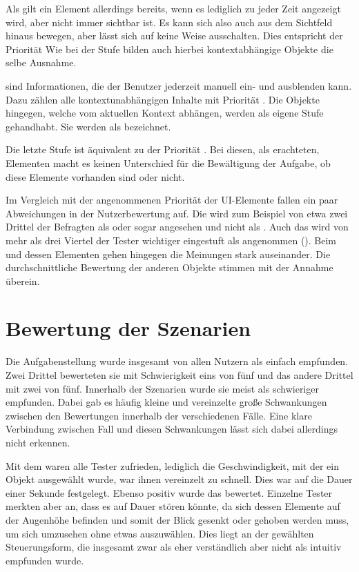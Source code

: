 		Als  gilt ein Element allerdings bereits, wenn es lediglich zu jeder Zeit angezeigt wird, aber nicht immer sichtbar ist. Es kann sich also auch aus dem Sichtfeld hinaus bewegen, aber lässt sich auf keine Weise ausschalten. Dies entspricht der Priorität  Wie bei der Stufe  bilden auch hierbei kontextabhängige Objekte die selbe Ausnahme.
		
		 sind Informationen, die der Benutzer jederzeit manuell ein- und ausblenden kann. Dazu zählen alle kontextunabhängigen Inhalte mit Priorität .
		Die Objekte hingegen, welche vom aktuellen Kontext abhängen, werden als eigene Stufe gehandhabt. Sie werden als  bezeichnet.
		
		Die letzte Stufe ist äquivalent zu der Priorität . Bei diesen, als  erachteten, Elementen macht es keinen Unterschied für die Bewältigung der Aufgabe, ob diese Elemente vorhanden sind oder nicht.
		
		Im Vergleich mit der angenommenen Priorität der UI-Elemente fallen ein paar Abweichungen in der Nutzerbewertung auf. Die  wird zum Beispiel von etwa zwei Drittel der Befragten als  oder sogar  angesehen und nicht als . Auch das  wird von mehr als drei Viertel der Tester wichtiger eingestuft als angenommen (). Beim  und dessen Elementen gehen hingegen die Meinungen stark auseinander. Die durchschnittliche Bewertung der anderen Objekte stimmen mit der Annahme überein.
	
	\section{Bewertung der Szenarien}\label{chapter:resultsSzen}
	
		Die Aufgabenstellung wurde insgesamt von allen Nutzern als einfach empfunden. Zwei Drittel bewerteten sie mit Schwierigkeit eins von fünf und das andere Drittel mit zwei von fünf. Innerhalb der Szenarien wurde sie meist als schwieriger empfunden. Dabei gab es häufig kleine und vereinzelte große Schwankungen zwischen den Bewertungen innerhalb der verschiedenen Fälle. Eine klare Verbindung zwischen Fall und diesen Schwankungen lässt sich dabei allerdings nicht erkennen.
		
		Mit dem  waren alle Tester zufrieden, lediglich die Geschwindigkeit, mit der ein Objekt ausgewählt wurde, war ihnen vereinzelt zu schnell. Dies war auf die Dauer einer Sekunde festgelegt.
		Ebenso positiv wurde das  bewertet. Einzelne Tester merkten aber an, dass es auf Dauer stören könnte, da sich dessen Elemente auf der Augenhöhe befinden und somit der Blick gesenkt oder gehoben werden muss, um sich umzusehen ohne etwas auszuwählen. Dies liegt an der gewählten Steuerungsform, die insgesamt zwar als eher verständlich aber nicht als intuitiv empfunden wurde.
		
